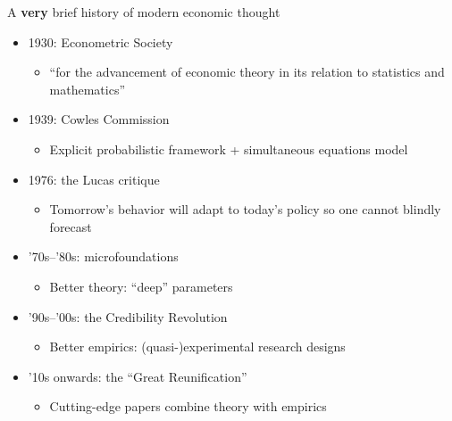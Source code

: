 \documentclass[aspectratio=169,compress,t,xcolor=table]{beamer}
\begin{document}
\begin{frame}{A \textbf{very} brief history of modern economic thought}
  \begin{itemize}
    \vfill\item 1930: Econometric Society 
    \begin{itemize}
      \item ``for the advancement of economic theory in its relation to statistics and mathematics''
    \end{itemize}

    \vfill\item 1939: Cowles Commission
    \begin{itemize}
      \item Explicit probabilistic framework + simultaneous equations model
    \end{itemize}

    \vfill\item 1976: the Lucas critique
    \begin{itemize}
      \item Tomorrow's behavior will adapt to today's policy so one cannot blindly forecast
    \end{itemize}

    \vfill\item '70s--'80s: microfoundations
    \begin{itemize}
      \item Better theory: ``deep'' parameters
    \end{itemize}

    \vfill\item '90s--'00s: the Credibility Revolution
    \begin{itemize}
      \item Better empirics: (quasi-)experimental research designs
    \end{itemize}

    \vfill\item '10s onwards: the ``Great Reunification''
    \begin{itemize}
      \item Cutting-edge papers combine theory with empirics
    \end{itemize}
  \end{itemize}
\end{frame}
\end{document}
